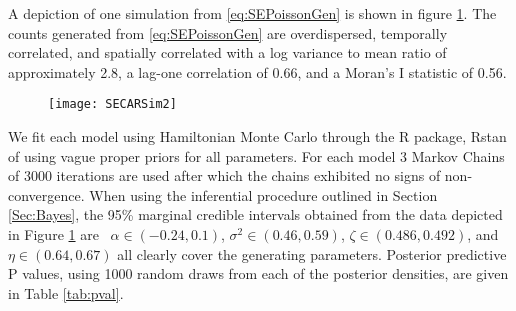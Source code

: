 \documentclass[11pt]{isuthesis}
\begin{document}
A depiction of one simulation from \eqref{eq:SEPoissonGen} is shown in figure \ref{fig:SEPoissonGen}.  The counts generated from \eqref{eq:SEPoissonGen} are overdispersed, temporally correlated, and spatially correlated  with a log variance to mean ratio of approximately 2.8, a lag-one correlation of 0.66, and a Moran's I statistic of 0.56.


\begin{figure}[!htp]
	\centering
	\texttt{[image: SECARSim2]}
	\label{fig:SEPoissonGen}
\end{figure}

We fit each model using Hamiltonian Monte Carlo through the R package, Rstan of \cite{gelman2015stan} using vague proper priors for all parameters.  For each model 3 Markov Chains of 3000 iterations are used after which the chains exhibited no signs of non-convergence.  When using the inferential procedure outlined in Section \ref{Sec:Bayes}, the 
95\% marginal credible intervals obtained from the data depicted in Figure \ref{fig:SEPoissonGen} are \ $\alpha \in (-0.24,0.1)$, $\sigma^2 \in (0.46,0.59)$, $\zeta \in (0.486,0.492)$, and $\eta \in (0.64,0.67)$ all clearly cover the generating parameters.  Posterior predictive P values, using 1000 random draws from each of the posterior densities, are given in Table \ref{tab:pval}.
\end{document}
